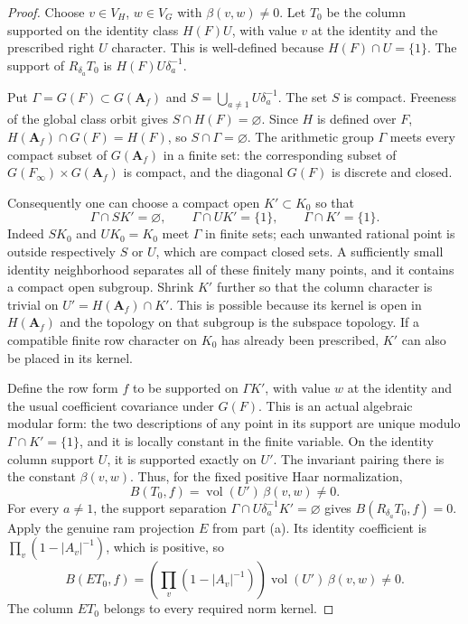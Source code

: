 \begin{proof}
Choose $v\in V_H$, $w\in V_G$ with $\beta(v,w)\ne0$.
Let $T_0$ be the column supported on the identity class
$H(F)U$, with value $v$ at the identity and the prescribed right
$U$ character.  This is well-defined because $H(F)\cap U=\{1\}$.
The support of $R_{\delta_a}T_0$ is
$H(F)U\delta_a^{-1}$.

Put $\Gamma=G(F)\subset G(\mathbf A_f)$ and
$S=\bigcup_{a\ne1}U\delta_a^{-1}$.
The set $S$ is compact.  Freeness of the global class orbit gives
$S\cap H(F)=\varnothing$.  Since $H$ is defined over $F$,
$H(\mathbf A_f)\cap G(F)=H(F)$, so $S\cap\Gamma=\varnothing$.
The arithmetic group $\Gamma$ meets every compact subset of
$G(\mathbf A_f)$ in a finite set: the corresponding subset of
$G(F_\infty)\times G(\mathbf A_f)$ is compact, and the diagonal
$G(F)$ is discrete and closed.

Consequently one can choose a compact open $K'\subset K_0$ so that
\[
 \Gamma\cap SK'=\varnothing,
 \qquad \Gamma\cap UK'=\{1\},
 \qquad \Gamma\cap K'=\{1\}.
\]
Indeed $SK_0$ and $UK_0=K_0$ meet $\Gamma$ in finite sets;
each unwanted rational point is outside respectively $S$ or $U$,
which are compact closed sets.  A sufficiently small identity
neighborhood separates all of these finitely many points, and it
contains a compact open subgroup.  Shrink $K'$ further so that
the column character is trivial on
$U'=H(\mathbf A_f)\cap K'$.  This is possible because its kernel
is open in $H(\mathbf A_f)$ and the topology on that subgroup is
the subspace topology.  If a compatible finite row character on
$K_0$ has already been prescribed, $K'$ can also be placed in its
kernel.

Define the row form $f$ to be supported on $\Gamma K'$, with value
$w$ at the identity and the usual coefficient covariance under
$G(F)$.  This is an actual algebraic modular form: the two
descriptions of any point in its support are unique modulo
$\Gamma\cap K'=\{1\}$, and it is locally constant in the finite
variable.  On the identity column support $U$, it is supported
exactly on $U'$.  The invariant pairing there is the constant
$\beta(v,w)$.  Thus, for the fixed positive Haar normalization,
\[
 B(T_0,f)=\operatorname{vol}(U')\,\beta(v,w)\ne0.
\]
For every $a\ne1$, the support separation
$\Gamma\cap U\delta_a^{-1}K'=\varnothing$ gives
$B(R_{\delta_a}T_0,f)=0$.
Apply the genuine ram projection $E$ from part (a).  Its identity
coefficient is $\prod_v(1-|A_v|^{-1})$, which is positive, so
\[
 B(ET_0,f)=
 \left(\prod_v(1-|A_v|^{-1})\right)
 \operatorname{vol}(U')\,\beta(v,w)\ne0.
\]
The column $ET_0$ belongs to every required norm kernel.
\end{proof}

